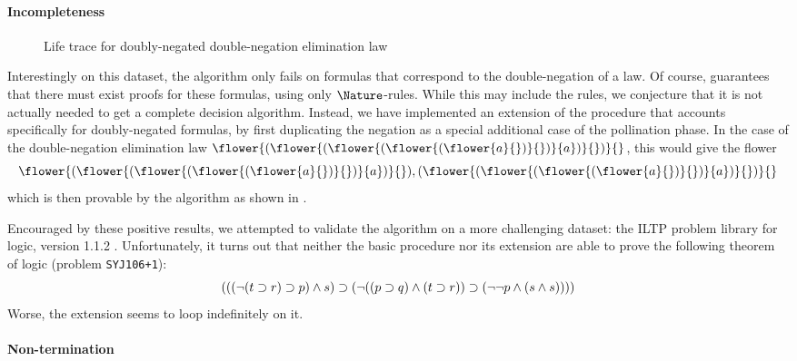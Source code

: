 \begin{scope}
\paragraph{Incompleteness}

\begin{figure*}
  
  \caption{Life trace for doubly-negated double-negation elimination law}
\end{figure*}

Interestingly on this dataset, the algorithm only fails on formulas that
correspond to the double-negation of a  law. Of course,
 guarantees that there must exist proofs for these
formulas, using only $\Nature$-rules. While this may include the 
rules, we conjecture that it is not actually needed to get a complete decision
algorithm. Instead, we have implemented an extension of the 
procedure that accounts specifically for doubly-negated formulas, by first
duplicating the  negation as a special additional case of the
pollination phase. In the case of the double-negation elimination law
$\flower{(\flower{(\flower{(\flower{(\flower{a}{})}{})}{a})}{})}{}$, this
would give the flower
$$\flower{(\flower{(\flower{(\flower{(\flower{a}{})}{})}{a})}{}),
(\flower{(\flower{(\flower{(\flower{a}{})}{})}{a})}{})}{}$$
which is then provable by the algorithm as shown in .

Encouraged by these positive results, we attempted to validate the algorithm on
a more challenging dataset: the ILTP problem library for  logic,
version 1.1.2 . Unfortunately, it turns out that
neither the basic  procedure nor its extension are able to prove
the following theorem of  logic (problem \texttt{SYJ106+1}):
$$(((\neg (t \supset r) \supset p) \land s) \supset (\neg ((p \supset q) \land (t \supset
r)) \supset (\neg \neg p \land (s \land s))))$$
Worse, the extension seems to loop indefinitely on it.

\paragraph{Non-termination}


\end{scope}
